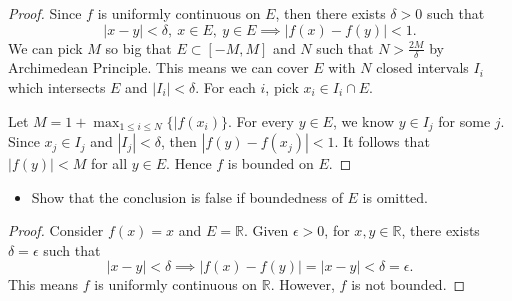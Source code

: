 \begin{Exercise}
	\begin{proof}
		Since $f$ is uniformly continuous on $E$, then there exists $\delta>0$ such that
		$$
		|x-y|<\delta,\ x\in E,\ y\in E \implies |f(x)-f(y)|< 1.
		$$
		We can pick $M$ so big that $E\subset [-M,M]$ and $N$ such that $N>\frac{2M}{\delta}$ by Archimedean Principle.
		This means we can cover $E$ with $N$ closed intervals $I_i$ which intersects $E$ and $|I_i|<\delta$.
		For each $i$, pick $x_i\in I_i\cap E$.
		
		Let $M = 1 + \max_{1\leq i \leq N}\{|f(x_i)\}$.
		For every $y\in E$, we know $y\in I_j$ for some $j$.
		Since $x_j\in I_j$ and $|I_j|<\delta$, then $|f(y)-f(x_j)|<1$.
		It follows that $|f(y)|<M$ for all $y\in E$.
		Hence $f$ is bounded on $E$.
	\end{proof}
	\begin{itemize}
		\item Show that the conclusion is false if boundedness of $E$ is omitted.
	\end{itemize}
	\begin{proof}
		Consider $f(x) = x$ and $E = \mathbb{R}$.
		Given $\epsilon>0$, for $x,y\in \mathbb{R}$, there exists $\delta = \epsilon$ such that
		$$
		|x-y|<\delta \implies |f(x)-f(y)| = |x-y| < \delta = \epsilon.
		$$
		This means $f$ is uniformly continuous on $\mathbb{R}$.
		However, $f$ is not bounded.
	\end{proof}
\end{Exercise}